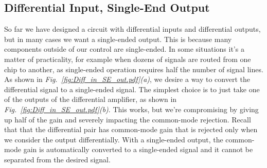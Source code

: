 \subsection{Differential Input, Single-End Output}
So far we have designed a circuit with differential inputs and differential outputs, but in many cases we want a single-ended output.  This is because many components outside of our control are single-ended.  In some situations it's a matter of practicality, for example when dozens of signals are routed from one chip to another, as single-ended operation requires half the number of signal lines.  As shown in \emph{Fig.~\ref{fig:Diff_in_SE_out.pdf}(a)}, we desire a way to convert the differential signal to a single-ended signal.  The simplest choice is to just take one of the outputs of the differential amplifier, as shown in \emph{Fig.~\ref{fig:Diff_in_SE_out.pdf}(b)}.   This works, but we're compromising by giving up half of the gain and severely impacting the common-mode rejection.  Recall that that the differential pair has common-mode gain that is rejected only when we consider the output differentially.  With a single-ended output, the common-mode gain is automatically converted to a single-ended signal and it cannot be separated from the desired signal.
